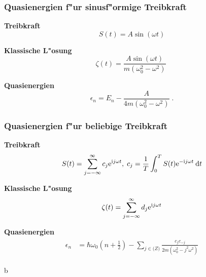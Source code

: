 \begin{frame}
  \frametitle{Quasienergien f"ur sinusf"ormige Treibkraft}
  \textbf{Treibkraft}
  \begin{equation}
    S(t)=A\sin(\omega t)
  \end{equation}

  \textbf{Klassische L"osung}
  \begin{equation}
    \zeta(t) = \frac{A\sin(\omega t)}{m(\omega_0^2 - \omega^2)} \;
  \end{equation}

  \textbf{Quasienergien}
  \begin{equation}
    \epsilon_n  = E_n - \frac{A}{4m(\omega_0^2-\omega^2)} \;.
  \end{equation}
\end{frame}

\begin{frame}
  \frametitle{Quasienergien f"ur beliebige Treibkraft}
  \textbf{Treibkraft}%
  \begin{equation}
    S(t) = \sum_{j=-\infty}^\infty c_j \text e^{\text ij\omega t}, \; c_j = \frac{1}{T} \int_0^T S(t) \text e^{-\text ij\omega t} \: \text d t
  \end{equation}

  \textbf{Klassische L"osung}
  \begin{equation}
    \zeta(t) = \sum_{j=-\infty}^\infty d_j \text e^{\text ij\omega t}
  \end{equation}


  \textbf{Quasienergien}
  \begin{align}
    \begin{split}
      \epsilon_n &= \hbar \omega_0\left(n+\frac{1}{2}\right) - \sum_{j \in \mathbb(Z)} \frac{c_jc_{-j}}{2m(\omega_0^2-j^2\omega^2)}
    \end{split}
  \end{align}

\end{frame}




























b
